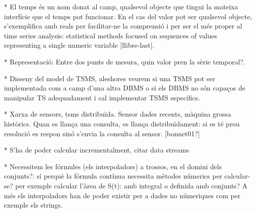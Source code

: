 * El temps és un nom donat al camp, qualsevol objecte que tingui la mateixa interfície que el temps pot funcionar. En el cas del valor pot ser qualsevol objecte, s'exemplifica amb reals per facilitar-ne la comprensió i per ser el més proper al time series analysis: statistical methods focused on sequences of values representing a single numeric variable [llibre-last].




* Representació: Entre dos punts de mesura, quin valor pren la sèrie temporal?.


* Disseny del model de TSMS, aleshores veurem si una TSMS pot ser implementada com a camp d'una altra DBMS o si els DBMS no són capaços de manipular TS adequadament i cal implementar TSMS específics.

* Xarxa de sensors, tsms distribuïda. Sensor dades recents, màquina grossa històrics. Quan es llança una consulta, es llança distribuïdament: si es té prou resolució es respon sinó s'envia la consulta al sensor. [bonnet01?]

* S'ha de poder calcular incrementalment, citar data streams

* Necessitem les fórmules (els interpoladors) a trossos, en el domini dels conjunts?: sí perquè la fórmula contínua necessita mètodes númerics per calcular-se? per exemple calcular l'àrea de S(t): amb integral o definida amb conjunts?
A més els interpoladors han de poder existir per a dades no númeriques com per exemple els strings.